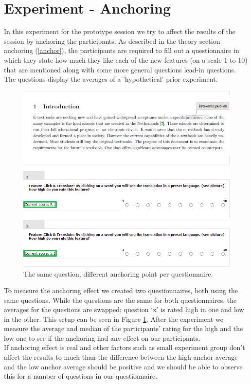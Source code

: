 \documentclass[Main.tex]{subfiles}
\begin{document}
\section{Experiment - Anchoring}

In this experiment for the prototype session we try to affect the results of the session by anchoring the participants. As described in the theory section anchoring (\ref{anchor}), the participants are required to fill out a questionnaire in which they state how much they like each of the new features (on a scale 1 to 10) that are mentioned along with some more general questions lead-in questions. The questions display the averages of a 'hypothetical' prior experiment.  \\

\begin{figure}
\includegraphics[width=1\textwidth]{QuestionComparison.png}
\caption{The same question, different anchoring point per questionnaire.}
\label{fig:qComp}
\end{figure}

To measure the anchoring effect we created two questionnaires, both using the same questions. While the questions are the same for both questionnaires, the averages for the questions are swapped; question `x' is rated high in one and low in the other. This setup can be seen in Figure \ref{fig:qComp}. After the experiment we measure the average and median of the participants' rating for the high and the low one to see if the anchoring had any effect on our participants.\\

If anchoring effect is real and other factors such as small experiment group don't affect the results to much than the difference between the high anchor average and the low anchor average should be positive and we should be able to observe this for a number of questions in our questionnaire.
\end{document}
